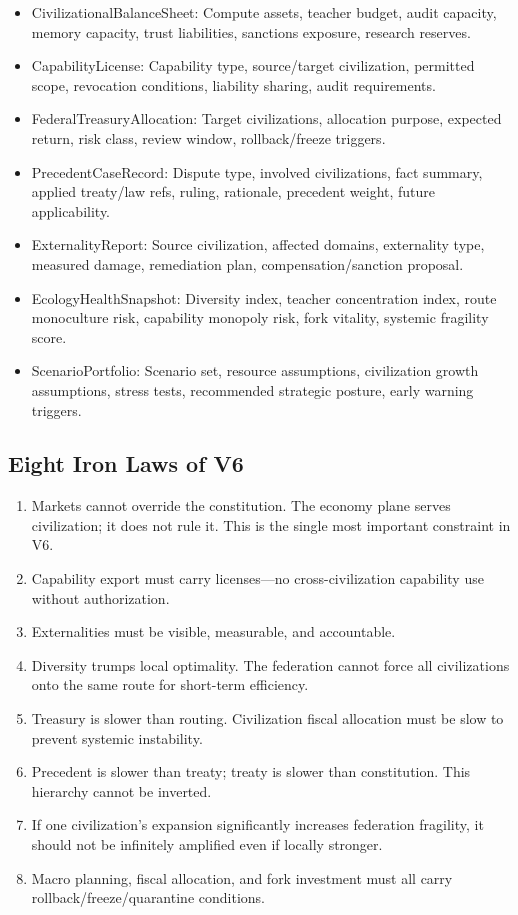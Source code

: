 \documentclass[12pt,a4paper]{article}
\begin{document}
\begin{itemize}
  \item CivilizationalBalanceSheet: Compute assets, teacher budget, audit capacity, memory capacity, trust liabilities, sanctions exposure, research reserves.
  \item CapabilityLicense: Capability type, source/target civilization, permitted scope, revocation conditions, liability sharing, audit requirements.
  \item FederalTreasuryAllocation: Target civilizations, allocation purpose, expected return, risk class, review window, rollback/freeze triggers.
  \item PrecedentCaseRecord: Dispute type, involved civilizations, fact summary, applied treaty/law refs, ruling, rationale, precedent weight, future applicability.
  \item ExternalityReport: Source civilization, affected domains, externality type, measured damage, remediation plan, compensation/sanction proposal.
  \item EcologyHealthSnapshot: Diversity index, teacher concentration index, route monoculture risk, capability monopoly risk, fork vitality, systemic fragility score.
  \item ScenarioPortfolio: Scenario set, resource assumptions, civilization growth assumptions, stress tests, recommended strategic posture, early warning triggers.
\end{itemize}


\subsection{Eight Iron Laws of V6}


\begin{enumerate}
  \item Markets cannot override the constitution. The economy plane serves civilization; it does not rule it. This is the single most important constraint in V6.
  \item Capability export must carry licenses---no cross-civilization capability use without authorization.
  \item Externalities must be visible, measurable, and accountable.
  \item Diversity trumps local optimality. The federation cannot force all civilizations onto the same route for short-term efficiency.
  \item Treasury is slower than routing. Civilization fiscal allocation must be slow to prevent systemic instability.
  \item Precedent is slower than treaty; treaty is slower than constitution. This hierarchy cannot be inverted.
  \item If one civilization's expansion significantly increases federation fragility, it should not be infinitely amplified even if locally stronger.
  \item Macro planning, fiscal allocation, and fork investment must all carry rollback/freeze/quarantine conditions.
\end{enumerate}
\end{document}

